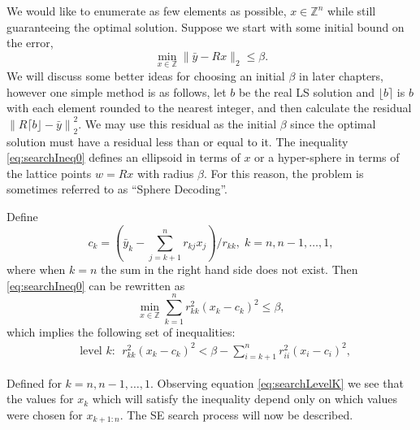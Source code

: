 \documentclass[12pt,Bold,letterpaper]{mcgilletdclass}
\newcommand{\be}{\begin{equation}}
\newcommand{\ee}{\end{equation}}
\newcommand{\by}{{\bar{y}}}
\begin{document}
We would like to enumerate as few elements as possible, $x \in \mathbb{Z}^n$ while still guaranteeing the optimal solution. Suppose we start with some initial bound on the error,
\be 
\label{eq:searchIneq0}
\min_{x \in  {\mathbb{Z}}}  \| \by- Rx \|_2 \le \beta. 
\ee
We will discuss some better ideas for choosing an initial $\beta$ in later chapters, however one simple method is as follows, let $b$ be the real LS solution and $\lfloor b \rceil$ is $b$ with each element rounded to the nearest integer, and then calculate the residual $\left \| R \lceil b \rfloor - \bar{y} \right \|_2^2$. We may use this residual as the initial $\beta$ since the optimal solution must have a residual less than or equal to it. The inequality \eqref{eq:searchIneq0} defines an ellipsoid in terms of $x$ or a hyper-sphere in terms of the lattice points $w=Rx$ with radius $\beta$. For this reason, the problem is sometimes referred to as ``Sphere Decoding''.

Define
\begin{equation}
 c_k = (\bar{y}_k - \sum_{j=k+1}^nr_{kj}x_j)/r_{kk}, \; k=n, n-1,\ldots, 1,
\label{eq:searchC}
\end{equation}
where when $k=n$ the sum in the right hand side does not exist.
Then \eqref{eq:searchIneq0} can be rewritten as
\begin{equation}\label{eq:searchIneq1}
\min_{x \in  {\mathbb{Z}}} \sum_{k=1}^n r_{kk}^2(x_k-c_k)^2 \le \beta,
\end{equation}
which implies the following
set of inequalities:
\begin{align}
&\text{level } k: \ \ r_{kk}^2(x_k-c_k)^2 < \beta -\sum_{i=k+1}^nr_{ii}^2(x_i-c_i)^2, \label{eq:searchLevelK}
\end{align}

Defined for $k=n,n-1,\ldots, 1$. Observing equation \eqref{eq:searchLevelK} we see that the values for $x_k$ which will satisfy the inequality depend only on which values were chosen for $x_{k+1:n}$. The SE search process will now be described.
\end{document}
